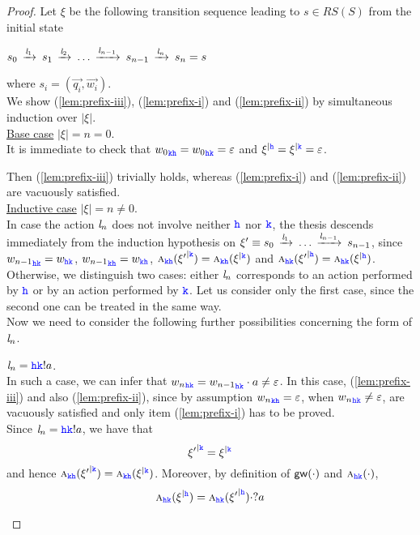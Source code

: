 \begin{proof}
Let $\xi$ be the following transition sequence leading to $s\in RS(S)$ from the initial state\\
\centerline{
$s_0\lts{\elle_1}s_1\lts{\elle_2} \ldots \lts{\elle_{n-1}}s_{n-1}\lts{\elle_n}s_n=s$}
where $s_i=(\vec{q_i},\vec{w_i})$.\\
We show  (\ref{lem:prefix-iii}), (\ref{lem:prefix-i}) and (\ref{lem:prefix-ii}) by simultaneous
 induction over $|\xi|$.\\
\underline{Base case} $|\xi|=n=0$. \\
It is immediate to check that  ${w_0}_{\KK\HH}={w_0}_{\HH\KK}=\varepsilon$
and $\restrictup{\xi}{\HH}=\restrictup{\xi}{\KK}=\varepsilon$. 

Then (\ref{lem:prefix-iii}) trivially holds,
whereas (\ref{lem:prefix-i}) and (\ref{lem:prefix-ii}) are vacuously satisfied.\\
\underline{Inductive case} $|\xi|=n\neq 0$.\\
In case the action $\elle_n$ does not involve neither $\HH$ nor $\KK$, the thesis descends immediately
from the induction hypothesis on $\xi' \equiv
s_0\lts{\elle_1} \ldots \lts{\elle_{n-1}}s_{n-1}$, since $ {w_{n-1}}_{\HH\KK}  = w_{\HH\KK}$,
$ {w_{n-1}}_{\KK\HH}  = w_{\KK\HH}$,  $\symb{\KK\HH}{\restrictup{\xi'}{\KK}}= \symb{\KK\HH}{\restrictup{\xi}{\KK}}$
 and $\symb{\HH\KK}{\restrictup{\xi'}{\HH}}= \symb{\HH\KK}{\restrictup{\xi}{\HH}}$.\\
Otherwise, we distinguish two cases: either $\elle_n$ corresponds to an action performed by $\HH$ or
by an action  performed by $\KK$. Let us consider only the first case, since the second one can be treated in the same way.\\
Now we need to consider the following further possibilities concerning the form
of $\elle_n$.


\begin{description}
\item
$\elle_n =\HH\KK!a$.\\
In such a case, we can infer that ${w_n}_{\HH\KK}= {w_{n-1}}_{\HH\KK}\cdot  a\neq\varepsilon$.
In this case, (\ref{lem:prefix-iii}) and also  (\ref{lem:prefix-ii}), since by assumption ${w_{n}}_{\KK\HH} = \varepsilon$, when ${w_{n}}_{\HH\KK} \neq \varepsilon$,
 are vacuously satisfied and only item (\ref{lem:prefix-i}) has to be proved.\\

Since $\elle_n =\HH\KK!a$, we have that 
\begin{equation}
\label{eq:weq}
\restrictup{\xi'}{\KK}=\restrictup{\xi}{\KK}
\end{equation}
and hence $\symb{\KK\HH}{\restrictup{\xi'}{\KK}} = \symb{\KK\HH}{\restrictup{\xi}{\KK}}$. 
Moreover, by definition of $\gateway{\cdot}$ and $\symb{\HH\KK}{\cdot}$, 
\begin{equation}
\label{eq:xipxi}
\symb{\HH\KK}{\restrictup{\xi}{\HH}} = \symb{\HH\KK}{\restrictup{\xi'}{\HH}}\cdot ?a
\end{equation}




\end{description}
\end{proof}
